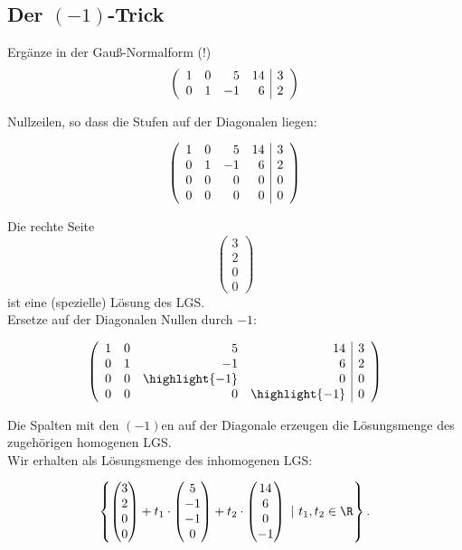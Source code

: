 \subsection*{Der $(-1)$-Trick}

Erg\"anze in der Gau{\ss}-Normalform (!)
$$
	\left(
		\begin{array}{rrrr | r}
			1	&0	&5	&14	&3	\\
			0	&1	&-1	&6	&2
		\end{array}
	\right)
$$

Nullzeilen, so dass die Stufen auf der Diagonalen liegen:

$$
	\left(
		\begin{array}{rrrr | r}
			1	&0	&5	&14	&3	\\
			0	&1	&-1	&6	&2	\\
			0	&0	&0	&0	&0	\\
			0	&0	&0	&0	&0
		\end{array}
	\right)
$$

Die rechte Seite 
$$
	\begin{pmatrix}
		3\\
		2\\
		0\\
		0
	\end{pmatrix}
$$
ist eine (spezielle) L\"osung des LGS.\\[1mm]

Ersetze auf der Diagonalen Nullen durch $-1$:

$$
	\left(
		\begin{array}{rrrr | r}
			1	&0	&5			&14			&3	\\
			0	&1	&-1			&6			&2	\\
			0	&0	&\highlight{-1}	&0			&0	\\
			0	&0	&0			&\highlight{-1}	&0
		\end{array}
	\right)
$$

Die Spalten mit den $(-1)$en auf der Diagonale erzeugen die L\"osungsmenge des zugeh\"origen homogenen LGS.\\[2mm]

Wir erhalten als L\"osungsmenge des inhomogenen LGS:

$$
	\left\{
		\begin{pmatrix}
			3\\
			2\\
			0\\
			0
		\end{pmatrix}
		+
		t_1 \cdot
		\begin{pmatrix}
			5\\
			-1\\
			-1\\
			0
		\end{pmatrix}	
		+t_2\cdot
		\begin{pmatrix}
			14\\
			6\\
			0\\
			-1
		\end{pmatrix}		
		~|~
		t_1, t_2 \in \R	
	\right\}.
$$

